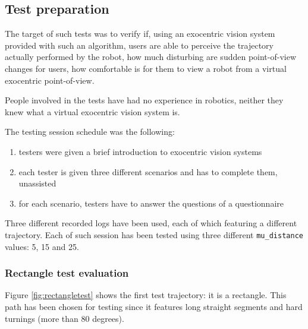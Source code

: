 \subsection{Test preparation}
\label{subsec:testpreparation}
%
The target of such tests was to verify  if, using 
an exocentric vision system provided with such an algorithm, 
users are able to perceive the trajectory actually 
performed by the robot,  how much disturbing are 
sudden point-of-view changes for users,  how 
comfortable is for them to view a robot from a 
virtual exocentric point-of-view.
%

%
People involved in the tests have had no experience in 
robotics, neither they knew what a virtual exocentric 
vision system is.
%

%
The testing session schedule was the following:
\begin{enumerate}
  \item testers were given a brief introduction to exocentric vision systems
  \item each tester is given three different scenarios and has to 
    complete them, unassisted
  \item for each scenario, testers have to answer the questions 
    of a questionnaire
\end{enumerate}
%

%
Three different recorded logs have been used, each of which featuring 
a different trajectory. Each of such session has been tested
using three different \texttt{mu\_distance} values: 5, 15 and 25. 
%
\subsubsection{Rectangle test evaluation}
\label{subsubsec:rectangletest}

Figure \ref{fig:rectangletest} shows the first test trajectory:
it is a rectangle. This path has been chosen for testing since it
features long straight segments and hard turnings (more than 80
degrees).

